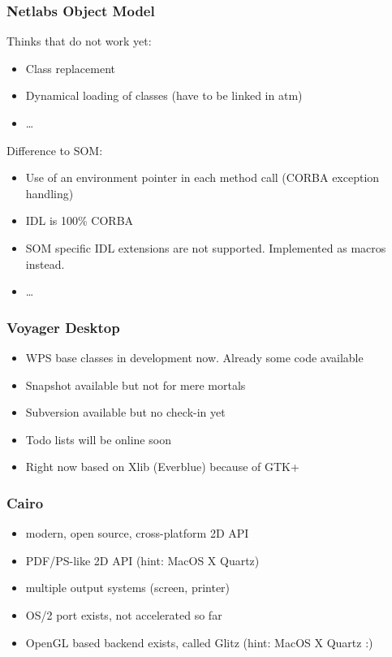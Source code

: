 \documentclass{beamer}
\begin{document}
\begin{frame}
\frametitle{Netlabs Object Model}
Thinks that do not work yet:
\begin{itemize}[<+->]
  \item Class replacement
  \item Dynamical loading of classes (have to be linked in atm)
  \item \ldots
\end{itemize}
Difference to SOM:
\begin{itemize}[<+->]
  \item Use of an environment pointer in each method call (CORBA exception
  handling)
  \item IDL is 100\% CORBA
  \item SOM specific IDL extensions are not supported. Implemented as macros
  instead.
  \item \ldots
\end{itemize}
\end{frame}

\begin{frame}
\frametitle{Voyager Desktop}
\begin{itemize}[<+->]
  \item WPS base classes in development now. Already some code available
  \item Snapshot available but not for mere mortals
  \item Subversion available but no check-in yet
  \item Todo lists will be online soon
  \item Right now based on Xlib (Everblue) because of GTK+
\end{itemize}
\end{frame}

\begin{frame}
\frametitle{Cairo}
\begin{itemize}[<+->]
  \item modern, open source, cross-platform 2D API
  \item PDF/PS-like 2D API (hint: MacOS X Quartz)
  \item multiple output systems (screen, printer)
  \item OS/2 port exists, not accelerated so far
  \item OpenGL based backend exists, called Glitz (hint: MacOS X Quartz :)
\end{itemize}
\end{frame}
\end{document}
